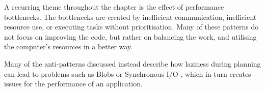 \documentclass[a4paper,UKenglish]{dagrep}
\begin{document}
A recurring theme throughout the chapter is the effect of performance bottlenecks. The bottlenecks are created by inefficient communication, inefficient resource use, or executing tasks without prioritisation. Many of these patterns do not focus on improving the code, but rather on balancing the work, and utilising the computer's resources in a better way.

Many of the anti-patterns discussed instead describe how laziness during planning can lead to problems such as Blobs \cite{brown1998antipatterns,detect_antipatterns} or Synchronous I/O \cite{MicrosoftAntipatterns}, which in turn creates issues for the performance of an application.

\printbibliography
\end{document}
